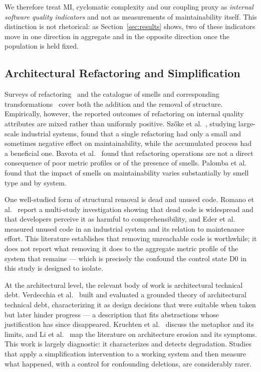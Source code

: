 \documentclass{sbc2019}%
\begin{document}
We therefore treat MI, cyclomatic complexity and our coupling proxy as
\emph{internal software quality indicators} and not as measurements of
maintainability itself. This distinction is not rhetorical: as
Section~\ref{sec:results} shows, two of these indicators move in one direction
in aggregate and in the opposite direction once the population is held fixed.

\subsection{Architectural Refactoring and Simplification}

Surveys of refactoring~\cite{mens2004} and the catalogue of smells and
corresponding transformations~\cite{fowler2018} cover both the addition and the
removal of structure. Empirically, however, the reported outcomes of refactoring
on internal quality attributes are mixed rather than uniformly positive.
Sz\H{o}ke et al.\ \cite{szoke2017}, studying large-scale industrial systems,
found that a single refactoring had only a small and sometimes negative effect
on maintainability, while the accumulated process had a beneficial one. Bavota
et al.\ \cite{bavota2015} found that refactoring operations are not a direct
consequence of poor metric profiles or of the presence of smells. Palomba et
al.\ \cite{palomba2018} found that the impact of smells on maintainability
varies substantially by smell type and by system.

One well-studied form of structural removal is dead and unused code. Romano et al.\ \cite{romano2020} report a multi-study
investigation showing that dead code is widespread and that developers perceive
it as harmful to comprehensibility, and Eder et al.\ \cite{eder2012} measured
unused code in an industrial system and its relation to maintenance effort.
This literature establishes that removing unreachable code is worthwhile; it
does not report what removing it does to the aggregate metric profile of the
system that remains --- which is precisely the confound the control state D0 in
this study is designed to isolate.

At the architectural level, the relevant body of work is architectural
technical debt. Verdecchia et al.\ \cite{verdecchia2020,verdecchia2021} built
and evaluated a grounded theory of architectural technical debt, characterizing
it as design decisions that were suitable when taken but later hinder progress
--- a description that fits abstractions whose justification has since
disappeared. Kruchten et al.\ \cite{kruchten2012} discuss the metaphor and its
limits, and Li et al.\ \cite{li2022} map the literature on architecture erosion
and its symptoms. This work is largely diagnostic: it characterizes and detects
degradation. Studies that apply a simplification intervention to a working
system and then measure what happened, with a control for confounding
deletions, are considerably rarer.
\end{document}
